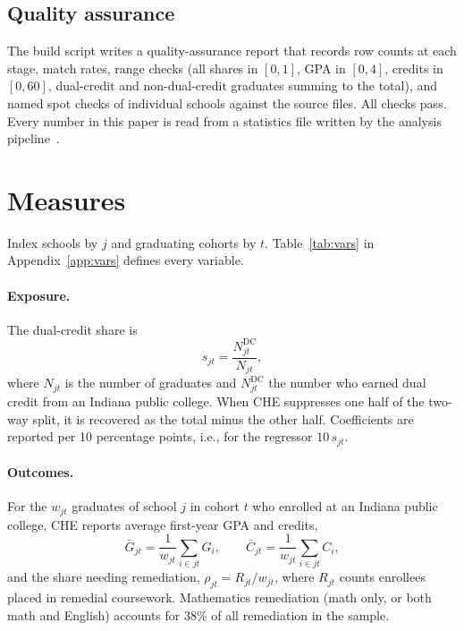 \documentclass[aps,prd,reprint,superscriptaddress,nofootinbib,floatfix]{revtex4-2}
\newcommand{\DC}{\mathrm{DC}}
\begin{document}
\subsection{Quality assurance}

The build script writes a quality-assurance report that records row counts at each stage, match rates, range checks (all shares in $[0,1]$, GPA in $[0,4]$, credits in $[0,60]$, dual-credit and non-dual-credit graduates summing to the total), and named spot checks of individual schools against the source files. All checks pass. Every number in this paper is read from a statistics file written by the analysis pipeline~\cite{repo}.

\section{Measures}\label{sec:measures}

Index schools by $j$ and graduating cohorts by $t$. Table~\ref{tab:vars} in Appendix~\ref{app:vars} defines every variable.

\paragraph*{Exposure.} The dual-credit share is
\begin{equation}
s_{jt}=\frac{N^{\DC}_{jt}}{N_{jt}},\label{eq:share}
\end{equation}
where $N_{jt}$ is the number of graduates and $N^{\DC}_{jt}$ the number who earned dual credit from an Indiana public college. When CHE suppresses one half of the two-way split, it is recovered as the total minus the other half. Coefficients are reported per 10 percentage points, i.e., for the regressor $10\,s_{jt}$.

\paragraph*{Outcomes.} For the $w_{jt}$ graduates of school $j$ in cohort $t$ who enrolled at an Indiana public college, CHE reports average first-year GPA and credits,
\begin{equation}
\bar G_{jt}=\frac{1}{w_{jt}}\sum_{i\in jt}G_i,\qquad \bar C_{jt}=\frac{1}{w_{jt}}\sum_{i\in jt}C_i,\label{eq:outcomes}
\end{equation}
and the share needing remediation, $\rho_{jt}=R_{jt}/w_{jt}$, where $R_{jt}$ counts enrollees placed in remedial coursework. Mathematics remediation (math only, or both math and English) accounts for 38\% of all remediation in the sample.
\end{document}
